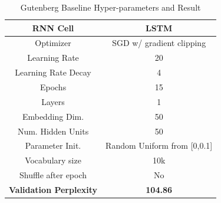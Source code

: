 \documentclass[a4paper]{article}
\begin{document}
\begin{table}[H]
\centering
\begin{tabular}{|c | c|} 
 \hline
RNN Cell & LSTM\\ \hline
Optimizer & SGD w/ gradient clipping \\ \hline
Learning Rate & 20 \\ \hline
Learning Rate Decay & 4 \\ \hline
Epochs & 15\\ \hline
Layers & 1\\ \hline
Embedding Dim. & 50\\ \hline
Num. Hidden Units & 50\\ \hline
Parameter Init. & Random Uniform from [0,0.1]\\ \hline
Vocabulary size & 10k\\ \hline
Shuffle after epoch & No \\ \hline
\textbf{Validation Perplexity} &\textbf{104.86} \\ \hline
\end{tabular}
\caption{Gutenberg Baseline Hyper-parameters and Result}
\label{table:1}
\end{table}
\end{document}
